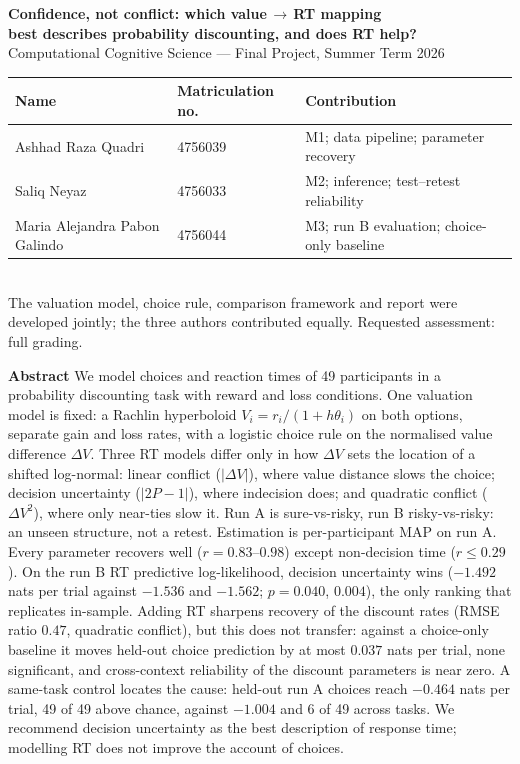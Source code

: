 \documentclass[11pt,a4paper]{article}
\begin{document}
\begin{center}
{\Large\bfseries Confidence, not conflict: which value\,$\to$\,RT mapping\\[2pt]
best describes probability discounting, and does RT help?}\\[6pt]
Computational Cognitive Science --- Final Project, Summer Term 2026\\[8pt]

\begin{tabular}{lll}
\textbf{Name} & \textbf{Matriculation no.} & \textbf{Contribution}\\
\hline
Ashhad Raza Quadri & 4756039 & M1; data pipeline; parameter recovery\\
Saliq Neyaz & 4756033 & M2; inference; test--retest reliability\\
Maria Alejandra Pabon Galindo & 4756044 & M3; run B evaluation; choice-only baseline\\
\end{tabular}\\[3pt]

{\small The valuation model, choice rule, comparison framework and report were developed
jointly; the three authors contributed equally. Requested assessment: full grading.}
\end{center}

\medskip

\noindent\textbf{Abstract}\quad
We model choices and reaction times of 49 participants in a probability discounting task with
reward and loss conditions. One valuation model is fixed: a Rachlin hyperboloid
$V_i=r_i/(1+h\theta_i)$ on both options, separate gain and loss rates, with a logistic
choice rule on the normalised value difference $\Delta V$. Three RT models differ only in
how $\Delta V$ sets the location of a shifted log-normal: linear conflict ($|\Delta V|$), where
value distance slows the choice; decision uncertainty ($|2P-1|$), where indecision does; and
quadratic conflict ($\Delta V^2$), where only near-ties slow it. Run A is sure-vs-risky, run B
risky-vs-risky: an unseen structure, not a retest. Estimation is per-participant MAP on run A.
Every parameter recovers well ($r=0.83$--$0.98$) except non-decision time ($r\le0.29$). On the run B RT predictive log-likelihood, decision uncertainty wins ($-1.492$ nats
per trial against $-1.536$ and $-1.562$; $p=0.040$, $0.004$), the only ranking that
replicates in-sample. Adding RT sharpens recovery of the discount rates (RMSE ratio
$0.47$, quadratic conflict), but this does not transfer: against a choice-only baseline it
moves held-out choice prediction by at most $0.037$ nats per trial, none significant, and
cross-context reliability of the discount parameters is near zero. A same-task control locates
the cause: held-out run A choices reach $-0.464$ nats per trial, 49 of 49 above
chance, against $-1.004$ and 6 of 49 across tasks. We recommend decision
uncertainty as the best description of response time; modelling RT does not improve the account
of choices.
\end{document}
